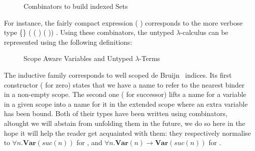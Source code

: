 \begin{figure}[h]
\begin{minipage}{0.45\textwidth}
\end{minipage}\hspace{2em}
\begin{minipage}{0.45\textwidth}
\end{minipage}

\begin{minipage}{0.25\textwidth}
\end{minipage}
\begin{minipage}{0.40\textwidth}
\end{minipage}\hspace{2em}
\begin{minipage}{0.25\textwidth}
\end{minipage}
\caption{Combinators to build indexed Sets}
\end{figure}

For instance, the fairly compact expression
\AF{[}   (  )   \AF{]}
corresponds to the more verbose type
 \{\}  ( ( )   ( ))   .
Using these combinators, the untyped $\lambda$-calculus can be represented
using the following definitions:

\begin{figure}[h]
\begin{minipage}{0.45\textwidth}
\end{minipage}\hspace{2em}
\begin{minipage}{0.45\textwidth}
\end{minipage}
\caption{Scope Aware Variables and Untyped $\lambda$-Terms\label{scoped-untyped}}
\end{figure}

The inductive family  corresponds to well scoped de Bruijn~\citeyear{de1972lambda}
indices. Its first constructor ( for zero) states that we have a name to refer to
the nearest binder in a non-empty scope. The second one ( for successor) lifts a
name for a variable in a given scope into a name for it in the extended scope where
an extra variable has been bound. Both of their types have been written using combinators,
altought we will abstain from unfolding them in the future, we do so here in the hope
it will help the reader get acquainted with them: they respectively normalise to
$\forall n. \mathbf{Var}(\mathit{suc}(n))$ for ,
and $\forall n. \mathbf{Var}(n) \rightarrow \mathbf{Var}(\mathit{suc}(n))$ for .

